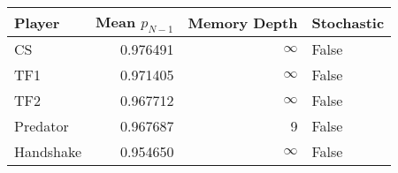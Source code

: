 \begin{tabular}{lrrl}
\toprule
    Player &  Mean $p_{N-1}$ &  Memory Depth & Stochastic \\
\midrule
        CS &        0.976491 &            \(\infty\) &      False \\
       TF1 &        0.971405 &            \(\infty\) &      False \\
       TF2 &        0.967712 &            \(\infty\) &      False \\
  Predator &        0.967687 &             9 &      False \\
 Handshake &        0.954650 &            \(\infty\) &      False \\
\bottomrule
\end{tabular}
